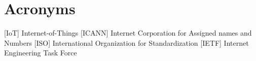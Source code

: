 \chapter*{Acronyms}




\begin{acronym}
       [IoT]   {Internet-of-Things}
     [ICANN] {Internet Corporation for Assigned names and Numbers}
       [ISO]   {International Organization for Standardization}
      [IETF]  {Internet Engineering Task Force}    %
\end{acronym}
